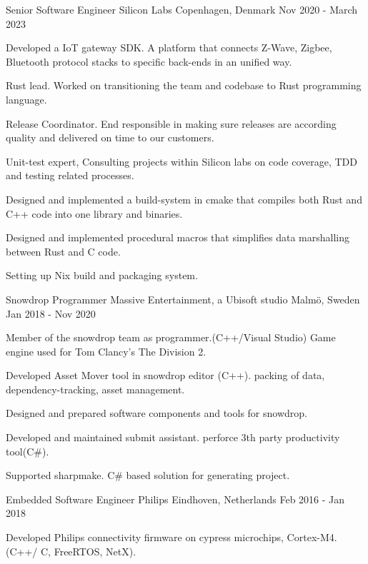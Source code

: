 \begin{cventries}
  \cventry
    {Senior Software Engineer}
    {Silicon Labs}
    {Copenhagen, Denmark}
    {Nov 2020 - March 2023}
    {
      \begin{cvitems}
		\item {Developed a IoT gateway SDK. A platform that connects Z-Wave, Zigbee, Bluetooth protocol stacks to specific back-ends in an unified way.}
		\item {Rust lead. Worked on transitioning the team and codebase to Rust programming language.}
		\item {Release Coordinator. End responsible in making sure releases are according quality and delivered on time to our customers.}
		\item {Unit-test expert, Consulting projects within Silicon labs on code coverage, TDD and testing related processes.}
		\item {Designed and implemented a build-system in cmake that compiles both Rust and C++ code into one library and binaries.}
		\item {Designed and implemented procedural macros that simplifies data marshalling between Rust and C code.}
		\item {Setting up Nix build and packaging system.}
      \end{cvitems}
    }
  \cventry
    {Snowdrop Programmer}
    {Massive Entertainment, a Ubisoft studio}
    {Malmö, Sweden}
    {Jan 2018 - Nov 2020}
    {
      \begin{cvitems}
		\item { Member of the snowdrop team as programmer.(C++/Visual Studio) Game engine used for Tom Clancy's The Division 2. }
        \item { Developed Asset Mover tool in snowdrop editor (C++). packing of data, dependency-tracking, asset management.}
		\item { Designed and prepared software components and tools for snowdrop. }
        \item { Developed and maintained submit assistant. perforce 3th party productivity tool(C\#). }
        \item { Supported sharpmake. C\# based solution for generating project. }
      \end{cvitems}
    }
  \cventry
    {Embedded Software Engineer}
    {Philips}
    {Eindhoven, Netherlands}
    {Feb 2016 - Jan 2018}
    {
      \begin{cvitems}
        \item {Developed Philips connectivity firmware on cypress microchips, Cortex-M4.(C++/ C, FreeRTOS, NetX).}

\end{cvitems}}
\end{cventries}
